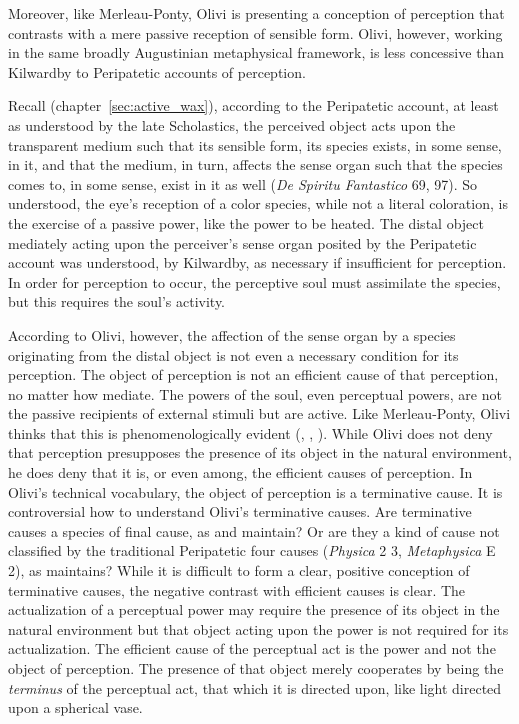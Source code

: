Moreover, like Merleau-Ponty, Olivi is presenting a conception of perception that contrasts with a mere passive reception of sensible form. Olivi, however, working in the same broadly Augustinian metaphysical framework, is less concessive than Kilwardby to Peripatetic accounts of perception. 

Recall (chapter~\ref{sec:active_wax}), according to the Peripatetic account, at least as understood by the late Scholastics, the perceived object acts upon the transparent medium such that its sensible form, its species exists, in some sense, in it, and that the medium, in turn, affects the sense organ such that the species comes to, in some sense, exist in it as well (\emph{De Spiritu Fantastico} 69, 97). So understood, the eye's reception of a color species, while not a literal coloration, is the exercise of a passive power, like the power to be heated. The distal object mediately acting upon the perceiver's sense organ posited by the Peripatetic account was understood, by Kilwardby, as necessary if insufficient for perception. In order for perception to occur, the perceptive soul must assimilate the species, but this requires the soul's activity. 

According to Olivi, however, the affection of the sense organ by a species originating from the distal object is not even a necessary condition for its perception. The object of perception is not an efficient cause of that perception, no matter how mediate. The powers of the soul, even perceptual powers, are not the passive recipients of external stimuli but are active. Like Merleau-Ponty, Olivi thinks that this is phenomenologically evident (\citealt[3--26, 39---54]{Tachau:1988aa}, \citealt[236--47]{Pasnau:1997aa}, \citealt[143]{Toivanen:2013ul}). While Olivi does not deny that perception presupposes the presence of its object in the natural environment, he does deny that it is, or even among, the efficient causes of perception. In Olivi's technical vocabulary, the object of perception is a terminative cause. It is controversial how to understand Olivi's terminative causes. Are terminative causes a species of final cause, as \citet[192--195]{Kent:1984zm} and \citet{Pasnau:1999kn} maintain? Or are they a kind of cause not classified by the traditional Peripatetic four causes (\emph{Physica} 2 3, \emph{Metaphysica} E 2), as \citet[chapter 6]{Toivanen:2013ul} maintains? While it is difficult to form a clear, positive conception of terminative causes, the negative contrast with efficient causes is clear. The actualization of a perceptual power may require the presence of its object in the natural environment but that object acting upon the power is not required for its actualization. The efficient cause of the perceptual act is the power and not the object of perception. The presence of that object merely cooperates by being the \emph{terminus} of the perceptual act, that which it is directed upon, like light directed upon a spherical vase.

